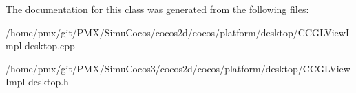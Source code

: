 The documentation for this class was generated from the following files\+:\begin{DoxyCompactItemize}
\item 
/home/pmx/git/\+P\+M\+X/\+Simu\+Cocos/cocos2d/cocos/platform/desktop/C\+C\+G\+L\+View\+Impl-\/desktop.\+cpp\item 
/home/pmx/git/\+P\+M\+X/\+Simu\+Cocos3/cocos2d/cocos/platform/desktop/C\+C\+G\+L\+View\+Impl-\/desktop.\+h\end{DoxyCompactItemize}
